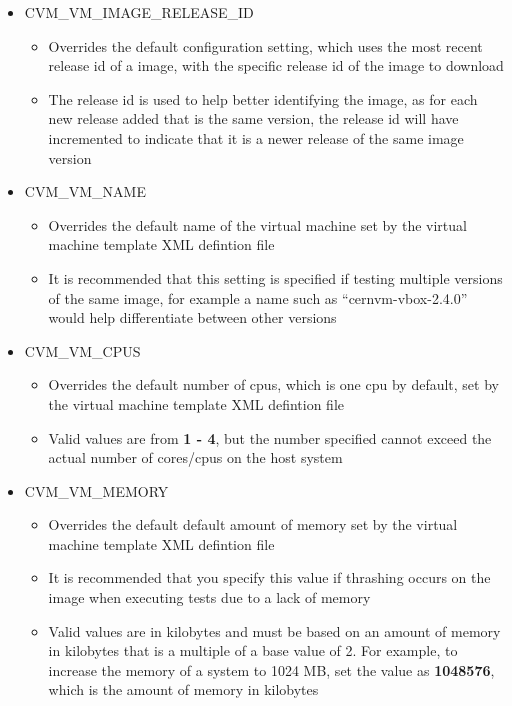 \begin{itemize}
\item	CVM\_VM\_IMAGE\_RELEASE\_ID
		\begin{itemize}
		\item	Overrides the default configuration setting, which uses the most recent
				release id of a \cernvm image, with the specific release id of the 
				\cernvm image to download
		\item	The release id is used to help better identifying the image, as for each new
				release added that is the same version, the release id will have incremented
				to indicate that it is a newer release of the same image version
		\end{itemize}
		
\item	CVM\_VM\_NAME
		\begin{itemize}
		\item	Overrides the default name of the virtual machine set by the 
				virtual machine template XML defintion file
		\item	It is recommended that this setting is specified if testing multiple
				versions of the same \cernvm image, for example a name such as
				``cernvm-vbox-2.4.0'' would help differentiate between other versions
		\end{itemize}
		
\item	CVM\_VM\_CPUS
		\begin{itemize}
		\item	Overrides the default number of cpus, which is one cpu by default,
				set by the virtual machine template XML defintion file
		\item	Valid values are from {\bf 1 - 4}, but the number specified cannot
				exceed the actual number of cores/cpus on the host system
		\end{itemize}
	
\item	CVM\_VM\_MEMORY
		\begin{itemize}
		\item	Overrides the default default amount of memory set by the virtual machine
				template XML defintion file
		\item	It is recommended that you specify this value if thrashing occurs on the
				\cernvm image when executing tests due to a lack of memory
		\item	Valid values are in kilobytes and must be based on an amount of memory in
				kilobytes that is a multiple of a base value of 2. For example, to increase
				the memory of a system to 1024 MB, set the value as {\bf 1048576}, which is the
				amount of memory in kilobytes
		\end{itemize}
		

\end{itemize}
